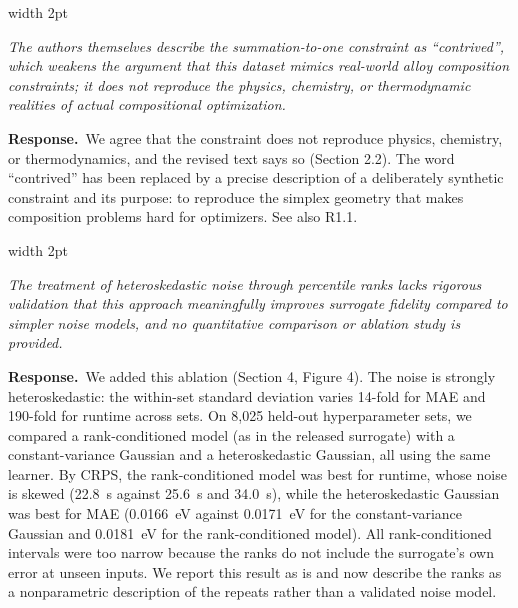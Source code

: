 \documentclass[11pt]{article}
\newenvironment{comment}
  {\par\medskip\noindent
   \begingroup\color{revrule}\leaders\vrule width 2pt\hfill\kern0pt\par\nobreak
   \endgroup
   \begin{list}{}{\setlength{\leftmargin}{1.5em}\setlength{\rightmargin}{0.5em}}%
   \item\itshape\ignorespaces}
  {\end{list}\par}
\newcommand{\response}{\par\noindent\textbf{\color{respblue}Response.}\ }
\begin{document}
\begin{comment}
The authors themselves describe the summation-to-one constraint as ``contrived'', which weakens the argument that this dataset mimics real-world alloy composition constraints; it does not reproduce the physics, chemistry, or thermodynamic realities of actual compositional optimization.
\end{comment}
\response We agree that the constraint does not reproduce physics, chemistry, or thermodynamics, and the revised text says so (Section 2.2). The word ``contrived'' has been replaced by a precise description of a deliberately synthetic constraint and its purpose: to reproduce the simplex geometry that makes composition problems hard for optimizers. See also R1.1.

\begin{comment}
The treatment of heteroskedastic noise through percentile ranks lacks rigorous validation that this approach meaningfully improves surrogate fidelity compared to simpler noise models, and no quantitative comparison or ablation study is provided.
\end{comment}
\response We added this ablation (Section 4, Figure 4). The noise is strongly heteroskedastic: the within-set standard deviation varies 14-fold for MAE and 190-fold for runtime across sets. On 8,025 held-out hyperparameter sets, we compared a rank-conditioned model (as in the released surrogate) with a constant-variance Gaussian and a heteroskedastic Gaussian, all using the same learner. By CRPS, the rank-conditioned model was best for runtime, whose noise is skewed (22.8~s against 25.6~s and 34.0~s), while the heteroskedastic Gaussian was best for MAE (0.0166~eV against 0.0171~eV for the constant-variance Gaussian and 0.0181~eV for the rank-conditioned model). All rank-conditioned intervals were too narrow because the ranks do not include the surrogate's own error at unseen inputs. We report this result as is and now describe the ranks as a nonparametric description of the repeats rather than a validated noise model.
\end{document}
